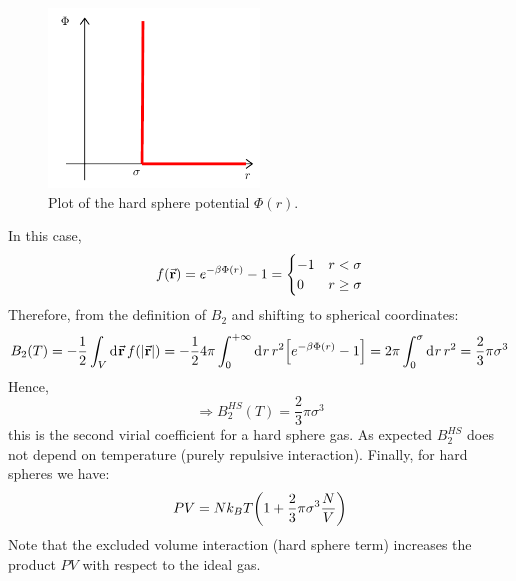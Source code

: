 \documentclass[../../Main/Main.tex]{subfiles}
\begin{document}
\begin{figure}[H]
\centering
\includegraphics[width=0.5\textwidth]{./img/1__1.pdf}
\caption{\label{fig:15_12} Plot of the hard sphere potential \( \Phi (r) \).}
\end{figure}

In this case,
\begin{equation}
  f(\va{r}) = e^{-\beta \Phi (r)} -1 = \begin{cases}
    -1 & r < \sigma\\
    0 & r \ge \sigma
  \end{cases}
\end{equation}
Therefore, from the definition of \( B_2 \) and shifting to spherical coordinates:
\begin{equation*}
  B_2 (T)= - \frac{1}{2} \int_{V}^{} \dd[]{\va{r}}  f \qty(\abs{\va{r}} )
  = - \frac{1}{2} 4 \pi \int_{0}^{+ \infty } \dd[]{r} r^2 \qty[e^{-\beta \Phi (r)}-1 ]
  = 2 \pi \int_{0}^{\sigma } \dd[]{r} r^2 = \frac{2}{3} \pi  \sigma ^3
\end{equation*}
Hence,
\begin{equation}
  \Rightarrow B_2^{HS} (T) = \frac{2}{3} \pi  \sigma ^3
\end{equation}
this is the second virial coefficient for a hard sphere gas.
As expected \(  B_2^{HS} \) does not depend on temperature (purely repulsive interaction). Finally, for hard spheres we have:
\begin{equation}
  P V = N k_B T \qty(1 + \frac{2}{3} \pi \sigma ^3 \frac{N}{V})
\end{equation}
Note that the excluded volume interaction (hard sphere term) increases the product \( PV \) with respect to the ideal gas.
\end{document}
